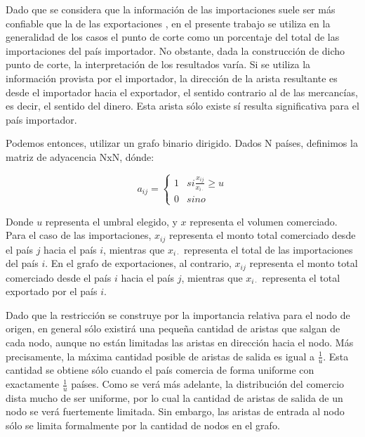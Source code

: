 \documentclass[class=article, crop=false]{standalone}
\begin{document}
Dado que se considera que la información de las importaciones suele ser más confiable que la de las exportaciones \citep{Fan2014}, en el presente trabajo se utiliza en la generalidad de los casos el punto de corte como un porcentaje del total de las importaciones del país importador. No obstante, dada la construcción de dicho punto de corte, la interpretación de los resultados varía. Si se utiliza la información provista por el importador, la dirección de la arista resultante es desde el importador hacia el exportador, el sentido contrario al de las mercancías, es decir, el sentido del dinero. Esta arista sólo existe sí resulta significativa para el país importador.     

Podemos entonces, utilizar un grafo binario dirigido. Dados N países, definimos la matriz de adyacencia NxN, dónde:

$$
a_{ij} = 
 \begin{cases} 
      1 & si \frac{x_{ij}}{x_{i\cdot}}\geq u \\
      0 & sino 
  \end{cases}
$$

Donde $u$ representa el umbral elegido, y $x$ representa el volumen comerciado.   
Para el caso de las importaciones, $x_{ij}$ representa el monto total comerciado desde el país $j$ hacia el país $i$, mientras que $x_{i\cdot}$ representa el total de las importaciones del país $i$. En el grafo de exportaciones, al contrario, $x_{ij}$ representa el monto total comerciado desde el país $i$ hacia el país $j$, mientras que $x_{i\cdot}$ representa el total exportado por el país $i$.          

Dado que la restricción se construye por la importancia relativa para el nodo de origen, en general sólo existirá una pequeña cantidad de aristas que salgan de cada nodo, aunque no están limitadas las aristas en dirección hacia el nodo. Más precisamente, la máxima cantidad posible de aristas de salida es igual a $\frac{1}{u}$. Esta cantidad se obtiene sólo cuando el país comercia de forma uniforme con exactamente $\frac{1}{u}$ países. Como se verá más adelante, la distribución del comercio dista mucho de ser uniforme, por lo cual la cantidad de aristas de salida de un nodo se verá fuertemente limitada. Sin embargo, las aristas de entrada al nodo sólo se limita formalmente por la cantidad de nodos en el grafo. 
\end{document}
